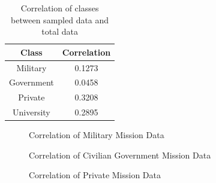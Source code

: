 \documentclass[11pt]{article}
\begin{document}
\begin{table}[h]
\small
\centering
\caption{Correlation of classes between sampled data and total data}
\label{correlation}
\begin{tabular}{|c|c|}
\hline
\textbf{Class} & \textbf{Correlation} \\ \hline
Military & 0.1273 \\ \hline
Government & 0.0458 \\ \hline
Private & 0.3208 \\ \hline
University & 0.2895 \\ \hline
\end{tabular}
\end{table}

\begin{figure}[ht!]
\centering
{}
\caption{Correlation of Military Mission Data}
\label{military}
\end{figure}

\begin{figure}[ht!]
\centering
{}
\caption{Correlation of Civilian Government Mission Data}
\label{gov}
\end{figure}

\begin{figure}[ht!]
\centering
{}
\caption{Correlation of Private Mission Data}
\label{private}
\end{figure}
\end{document}
